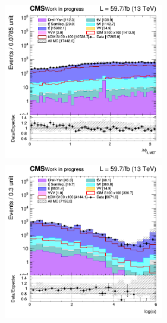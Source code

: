 \documentclass[a4paper, 10pt, openright]{report}
\begin{document}
\begin{figure}[htbp]
\centering
\begin{minipage}[b]{.48\textwidth}
\includegraphics[width=7cm, height=7cm]{figs/2018/SmearSR-ttDM-scalar100/log_cratio_topCR_ll_dphillmet.png}
\end{minipage}\hfill
\begin{minipage}[b]{.48\textwidth}
\includegraphics[width=7cm, height=7cm]{figs/2018/SmearSR-ttDM-scalar100/log_cratio_topCR_ll_reco_weight.png}
\end{minipage} \hfill


\end{figure}
\end{document}
